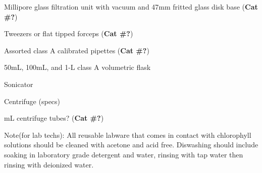 \documentclass[12pt]{../SOP2}
\begin{document}
\NP Millipore glass filtration unit with vacuum and 47mm fritted glass disk base (\textbf{Cat \#?})

\NP Tweezers or flat tipped forceps (\textbf{Cat \#?})

\NP Assorted class A calibrated pipettes (\textbf{Cat \#?})

\NP 50mL, 100mL, and 1-L class A volumetric flask

\NP Sonicator %

\NP Centrifuge (specs)

 mL centrifuge tubes? (\textbf{Cat \#?})%


\NP Note(for lab techs): All reusable labware that comes in contact with chlorophyll solutions should be cleaned with acetone and acid free. Diswashing should include soaking in laboratory grade detergent and water, rinsing with tap water then rinsing with deionized water. 
\end{document}
